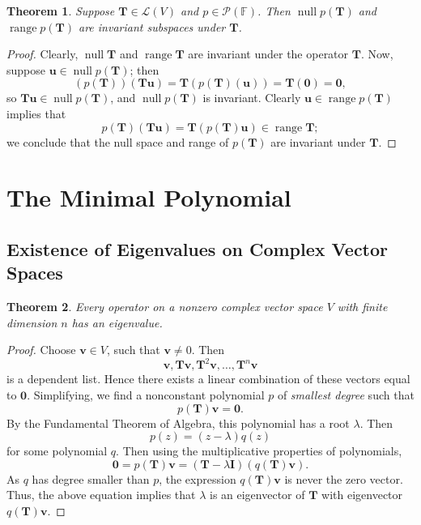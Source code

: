 \documentclass[11pt]{article}
\renewcommand{\vec}[1]{\mathbf{#1}}
\newcommand{\mat}[1]{\mathbf{#1}}
\newcommand{\nll}{\operatorname{null}}
\newcommand{\range}{\operatorname{range}}
\newtheorem{theorem}{Theorem}
\begin{document}
\begin{theorem}
	Suppose $\mat{T} \in \mathcal{L}(V)$ and $p \in \mathcal{P}(\mathbb{F})$. Then $\nll p(\mat{T})$ and $\range p(\mat{T})$ are invariant subspaces under $\mat{T}$.
\end{theorem}
\begin{adjustwidth}{1cm}{}
    \begin{proof}
		Clearly, $\nll \mat{T}$ and $\range \mat{T}$ are invariant under the operator $\mat{T}$. Now, suppose $\vec{u} \in \nll p(\mat{T})$; then
		\[
			(p(\mat{T}))(\mat{T} \vec{u}) = \mat{T} (p(\mat{T})(\vec{u})) = \mat{T} (\vec{0}) = \vec{0},
		\]
		so $\mat{T} \vec{u} \in \nll p(\mat{T})$, and $\nll p(\mat{T})$ is invariant. Clearly $\vec{u} \in \range p(\mat{T})$ implies that 
		\[
			p(\mat{T})(\mat{T}\vec{u}) = \mat{T} (p(\mat{T}) \vec{u}) \in \range \mat{T};
		\]
		we conclude that the null space and range of $p(\mat{T})$ are invariant under $\mat{T}$.
	\end{proof}
\end{adjustwidth}


\section{The Minimal Polynomial}


\subsection{Existence of Eigenvalues on Complex Vector Spaces}

\begin{theorem}
	Every operator on a nonzero complex vector space $V$ with finite dimension $n$ has an eigenvalue.
\end{theorem}
\begin{adjustwidth}{1cm}{}
	\begin{proof}
		Choose $\vec{v} \in V$, such that $\vec{v} \ne 0$. Then
		\[
			\vec{v}, \mat{T} \vec{v}, \mat{T}^{2} \vec{v}, \ldots, \mat{T}^{n} \vec{v}
		\]
		is a dependent list. Hence there exists a linear combination of these vectors equal to $\vec{0}$. Simplifying, we find a nonconstant polynomial $p$ of \textit{smallest degree} such that
		\[
			p(\mat{T}) \vec{v} = \vec{0}.
		\]
		By the Fundamental Theorem of Algebra, this polynomial has a root $\lambda$. Then 
		\[
			p(z) = (z - \lambda) q(z)
		\]
		for some polynomial $q$. Then using the multiplicative properties of polynomials,
		\[
			\vec{0} = p(\mat{T}) \vec{v} = (\mat{T} - \lambda \mat{I}) (q(\mat{T}) \vec{v}).
		\]
		 As $q$ has degree smaller than $p$, the expression $q(\mat{T}) \vec{v}$ is never the zero vector. Thus, the above equation implies that $\lambda$ is an eigenvector of $\mat{T}$ with eigenvector $q(\mat{T}) \vec{v}$. 
	\end{proof}
\end{adjustwidth} 
\end{document}
